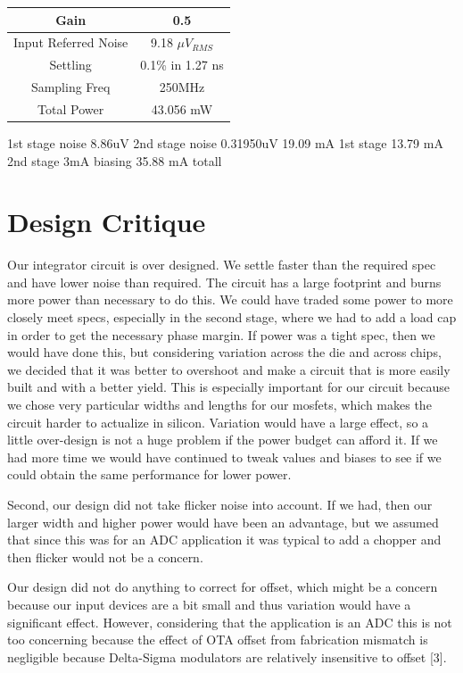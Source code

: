 \documentclass[conference]{IEEEtran}
\begin{document}
\begin{center}
\begin{tabular}{|c|c|} 
\hline
Gain & 0.5 \\
\hline
Input Referred Noise & 9.18 $\mu$$V_{RMS}$ \\
\hline
Settling & 0.1\% in 1.27 ns \\
\hline
Sampling Freq & 250MHz \\
\hline
Total Power & 43.056 mW \\
\hline
\end{tabular}
\end{center}

1st stage noise 8.86uV
2nd stage noise 0.31950uV
19.09 mA 1st stage
13.79 mA 2nd stage
3mA biasing
35.88 mA totall

\section{Design Critique}

Our integrator circuit is over designed. We settle faster than the required spec and have lower noise than required. The circuit has a large footprint and burns more power than necessary to do this. We could have traded some power to more closely meet specs, especially in the second stage, where we had to add a load cap in order to get the necessary phase margin. If power was a tight spec, then we would have done this, but considering variation across the die and across chips, we decided that it was better to overshoot and make a circuit that is more easily built and with a better yield. This is especially important for our circuit because we chose very particular widths and lengths for our mosfets, which makes the circuit harder to actualize in silicon. Variation would have a large effect, so a little over-design is not a huge problem if the power budget can afford it. If we had more time we would have continued to tweak values and biases to see if we could obtain the same performance for lower power.

Second, our design did not take flicker noise into account. If we had, then our larger width and higher power would have been an advantage, but we assumed that since this was for an ADC application it was typical to add a chopper and then flicker would not be a concern.

Our design did not do anything to correct for offset, which might be a concern because our input devices are a bit small and thus variation would have a significant effect. However, considering that the application is an ADC this is not too concerning because the effect of OTA offset from fabrication mismatch is negligible because Delta-Sigma modulators are relatively insensitive to offset [3].
\end{document}
